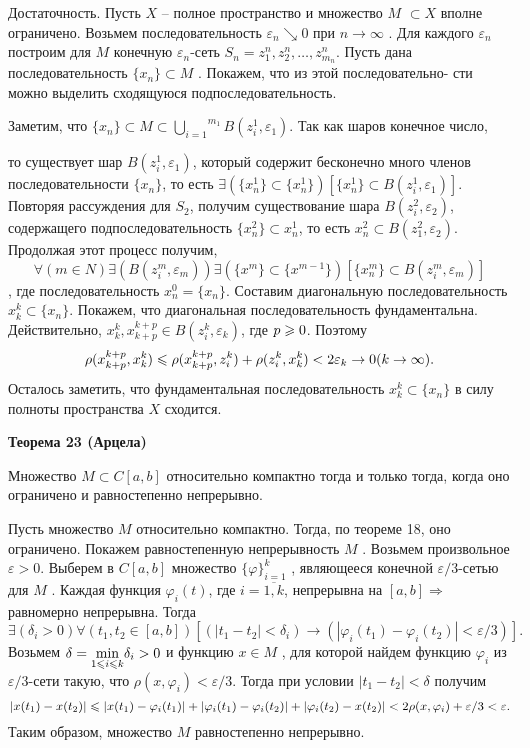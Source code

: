     Достаточность. Пусть $X$ – полное пространство и множество $M$  $\subset X$
    вполне ограничено. Возьмем последовательность $\varepsilon_n \searrow  0$ при
$n \rightarrow \infty$ .
    Для каждого
$ \varepsilon_n$ построим для $M$  конечную $\varepsilon_n$-сеть $S_n = {z^n_1, z^n_2, \dots, z^n_{m_n} }$. Пусть
    дана последовательность $\{x_n\} \subset M$ . Покажем, что из этой последовательно-
    сти можно выделить сходящуюся подпоследовательность.

    Заметим, что $\{x_n\} \subset M \subset \stackrel{m_1}{\underset{i=1}{\bigcup}} B(z^1_i, \varepsilon_1)$.
    Так как шаров конечное число,

    то существует шар $B(z^1_i, \varepsilon_1)$, который содержит бесконечно
    много членов последовательности $\{x_n\}$, то есть
$\exists(\{x^1_n \} \subset \{x^1_n\})[ \{x^1_n \} \subset B(z^1_i, \varepsilon_1) ]$.
    Повторяя
    рассуждения для $S_2$, получим существование шара $B(z^2_i, \varepsilon_2)$, содержащего
    подпоследовательность $\{x^2_n \} \subset {x^1_n }$, то есть ${x^2_n } \subset B(z^2_1, \varepsilon_2)$.
Продолжая    этот процесс получим,
$$\forall( m \in  N)\exists (B(z^m_i, \varepsilon_m))\exists (\{x^m\} \subset \{x^{m-1}\})
    [\{x^m_n \} \subset B(z^m_i, \varepsilon_m)]$$  ,
где последовательность ${x^0_n } = \{x_n\}$. Составим диагональную последовательность
${x_k^k} \subset \{x_n\}$. Покажем, что диагональная последовательность фундаментальна.
Действительно, $x_k^k, x_{k+p}^{k+p} \in  B(z^k_i, \varepsilon_k)$, где $p \geqslant 0$. Поэтому
$$\rho(x_{k+p}^{k+p}, x_k^k) \leqslant  \rho(x_{k+p}^{k+p}, z^k_i) + \rho(z^k_i, x_k^k) < 2\varepsilon_k \rightarrow 0
    (k \rightarrow \infty ).$$
Осталось заметить, что фундаментальная последовательность ${x^k_k} \subset \{x_n\}$ в
силу полноты пространства $X$ сходится.

\noindent\dotfill
    
\textbf{Теорема 23 (Арцела) }

Множество $M \subset C[a, b]$ относительно компактно
тогда и только тогда, когда оно ограничено и равностепенно непрерывно.

Пусть множество $M$ относительно компактно. Тогда, по теореме 18,
оно ограничено. Покажем равностепенную непрерывность $M$ .
Возьмем произвольное $\varepsilon   >  0$. Выберем в $C[a, b]$  множество $\{\varphi\}^k_{i=1}$	,
являющееся  конечной  $\varepsilon /3$-сетью  для  $M$ .  Каждая  функция  $\varphi_i(t)$,
где $ i  =  \overline{1,k}$,
непрерывна на $[a, b] \Rightarrow$ равномерно непрерывна. Тогда
$$\exists(\delta_i > 0)\forall(t_1, t_2 \in  [a, b]) [(|t_1-t_2| < \delta_i) \rightarrow
        (|\varphi_i (t_1)- \varphi_i(t_2)| < \varepsilon /3)].$$
Возьмем $\delta = \underset{1 \leqslant  i \leqslant  k}{\min}  \delta_i > 0$ и функцию 
$x \in  M$ , для которой найдем
функцию $\varphi_i$ из $\varepsilon /3$-сети такую, что $\rho(x, \varphi_i) < \varepsilon /3$. Тогда при
условии $|t_1-t_2| < \delta$ получим
$$|x(t_1)- x(t_2)| \leqslant  |x(t_1) -\varphi_i(t_1)| + |\varphi_i(t_1) -\varphi_i(t_2)|+
    |\varphi_i(t_2)- x(t_2)| < 2\rho(x, \varphi_i) + \varepsilon /3 < \varepsilon .$$
Таким образом, множество $M$ равностепенно непрерывно.

